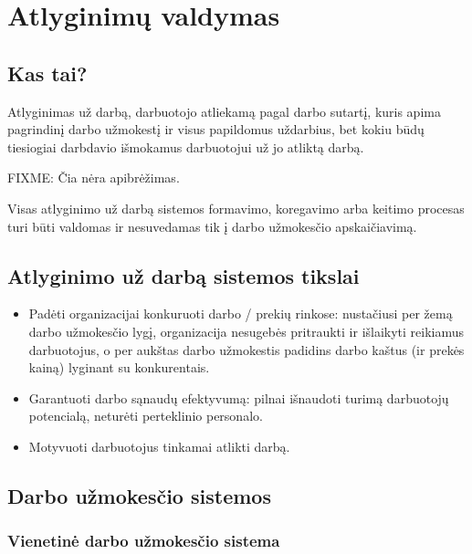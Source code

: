 \chapter{Atlyginimų valdymas}

\section{Kas tai?}

\begin{defn}
  Atlyginimas už darbą, darbuotojo atliekamą pagal darbo sutartį,
  kuris apima pagrindinį darbo užmokestį ir visus papildomus
  uždarbius, bet kokiu būdų tiesiogiai darbdavio išmokamus
  darbuotojui už jo atliktą darbą.
\end{defn}

\begin{defn}
  FIXME: Čia nėra apibrėžimas.

  Visas atlyginimo už darbą sistemos formavimo, koregavimo arba
  keitimo procesas turi būti valdomas ir nesuvedamas tik į darbo
  užmokesčio apskaičiavimą.
\end{defn}

\section{Atlyginimo už darbą sistemos tikslai}

\begin{itemize}
  \item Padėti organizacijai konkuruoti darbo / prekių rinkose:
    nustačiusi per žemą darbo užmokesčio lygį, organizacija nesugebės
    pritraukti ir išlaikyti reikiamus darbuotojus, o per aukštas
    darbo užmokestis padidins darbo kaštus (ir prekės kainą) lyginant
    su konkurentais.
  \item Garantuoti darbo sąnaudų efektyvumą: pilnai išnaudoti turimą
    darbuotojų potencialą, neturėti perteklinio personalo.
  \item Motyvuoti darbuotojus tinkamai atlikti darbą.
\end{itemize}

\section{Darbo užmokesčio sistemos}

\subsection{Vienetinė darbo užmokesčio sistema}

